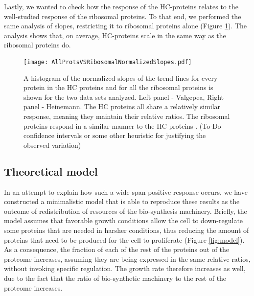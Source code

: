\documentclass[notitlepage]{article}
\begin{document}
Lastly, we wanted to check how the response of the HC-proteins relates to the well-studied response of the ribosomal proteins.
To that end, we performed the same analysis of slopes, restricting it to ribosomal proteins alone (Figure \ref{fig:globalfit}).
The analysis shows that, on average, HC-proteins scale in the same way as the ribosomal proteins do.

\begin{figure}[h]
\centering
\texttt{[image: AllProtsVSRibosomalNormalizedSlopes.pdf]}
\caption{
    A histogram of the normalized slopes of the trend lines for every protein in the HC proteins and for all the ribosomal proteins is shown for the two data sets analyzed.
    Left panel - Valgepea, Right panel - Heinemann.
    The HC proteins all share a relatively similar response, meaning they maintain their relative ratios.
    The ribosomal proteins respond in a similar manner to the HC proteins .
    (To-Do confidence intervals or some other heuristic for justifying the observed variation)
}
\label{fig:globalfit}
\end{figure}

\subsection{Theoretical model}
In an attempt to explain how such a wide-span positive response occurs, we have constructed a minimalistic model that is able to reproduce these results as the outcome of redistribution of resources of the bio-synthesis machinery.
Briefly, the model assumes that favorable growth conditions allow the cell to down-regulate some proteins that are needed in harsher conditions, thus reducing the amount of proteins that need to be produced for the cell to proliferate (Figure \ref{fig:model}).
As a consequence, the fraction of each of the rest of the proteins out of the proteome increases, assuming they are being expressed in the same relative ratios, without invoking specific regulation.
The growth rate therefore increases as well, due to the fact that the ratio of bio-synthetic machinery to the rest of the proteome increases.
\end{document}
